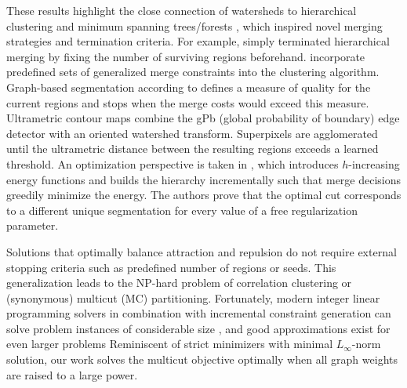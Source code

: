 These results highlight the close connection of watersheds to hierarchical clustering and minimum spanning trees/forests \cite{meyer1999morphological,najman_11_ultrametric-watersheds}, which inspired novel merging strategies and termination criteria. For example, \cite{salembier_00_binary-partition-tree} simply terminated hierarchical merging by fixing the number of surviving regions beforehand. \cite{malmberg2011generalized} incorporate predefined sets of generalized merge constraints into the clustering algorithm. Graph-based segmentation according to \cite{felzenszwalb_04_graph-based-image-segmentation} defines a measure of quality for the current regions and stops when the merge costs would exceed this measure. Ultrametric contour maps \cite{arbelaez_11_gpb} combine the gPb (global probability of boundary) edge detector with an oriented watershed transform. Superpixels are agglomerated until the ultrametric distance between the resulting regions exceeds a learned threshold. An optimization perspective is taken in \cite{kiran_13_hierarchical-cuts,guigues2006scale}, which introduces $h$-increasing energy functions and builds the hierarchy incrementally such that merge decisions greedily minimize the energy. The authors prove that the optimal cut corresponds to a different unique segmentation for every value of a free regularization parameter.

 Solutions that optimally balance attraction and repulsion do not require external stopping criteria such as predefined number of regions or seeds. This generalization leads to the NP-hard problem of correlation clustering or (synonymous) multicut (MC) partitioning. Fortunately, modern integer linear programming solvers in combination with incremental constraint generation can solve problem instances of considerable size \cite{andres_12_globally}, and good approximations exist for even larger problems \cite{yarkony2012fast,pape2017solving}
Reminiscent of strict minimizers \cite{Levi} with minimal $L_\infty$-norm solution, our work solves the multicut objective optimally when all graph weights are raised to a large power.



